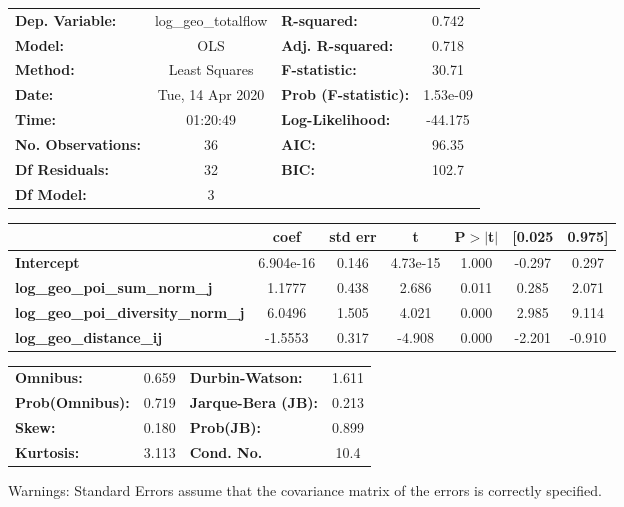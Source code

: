 \begin{center}
\begin{tabular}{lclc}
\toprule
\textbf{Dep. Variable:}                    & log\_geo\_totalflow & \textbf{  R-squared:         } &     0.742   \\
\textbf{Model:}                            &         OLS         & \textbf{  Adj. R-squared:    } &     0.718   \\
\textbf{Method:}                           &    Least Squares    & \textbf{  F-statistic:       } &     30.71   \\
\textbf{Date:}                             &   Tue, 14 Apr 2020  & \textbf{  Prob (F-statistic):} &  1.53e-09   \\
\textbf{Time:}                             &       01:20:49      & \textbf{  Log-Likelihood:    } &   -44.175   \\
\textbf{No. Observations:}                 &            36       & \textbf{  AIC:               } &     96.35   \\
\textbf{Df Residuals:}                     &            32       & \textbf{  BIC:               } &     102.7   \\
\textbf{Df Model:}                         &             3       & \textbf{                     } &             \\
\bottomrule
\end{tabular}
\begin{tabular}{lcccccc}
                                           & \textbf{coef} & \textbf{std err} & \textbf{t} & \textbf{P$> |$t$|$} & \textbf{[0.025} & \textbf{0.975]}  \\
\midrule
\textbf{Intercept}                         &    6.904e-16  &        0.146     &  4.73e-15  &         1.000        &       -0.297    &        0.297     \\
\textbf{log\_geo\_poi\_sum\_norm\_j}       &       1.1777  &        0.438     &     2.686  &         0.011        &        0.285    &        2.071     \\
\textbf{log\_geo\_poi\_diversity\_norm\_j} &       6.0496  &        1.505     &     4.021  &         0.000        &        2.985    &        9.114     \\
\textbf{log\_geo\_distance\_ij}            &      -1.5553  &        0.317     &    -4.908  &         0.000        &       -2.201    &       -0.910     \\
\bottomrule
\end{tabular}
\begin{tabular}{lclc}
\textbf{Omnibus:}       &  0.659 & \textbf{  Durbin-Watson:     } &    1.611  \\
\textbf{Prob(Omnibus):} &  0.719 & \textbf{  Jarque-Bera (JB):  } &    0.213  \\
\textbf{Skew:}          &  0.180 & \textbf{  Prob(JB):          } &    0.899  \\
\textbf{Kurtosis:}      &  3.113 & \textbf{  Cond. No.          } &     10.4  \\
\bottomrule
\end{tabular}
\end{center}

Warnings: \newline
 [1] Standard Errors assume that the covariance matrix of the errors is correctly specified.
